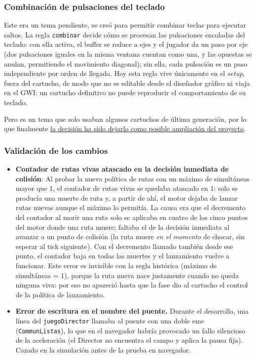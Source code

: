 \subsubsection{Combinación de pulsaciones del teclado}
Este era un tema pendiente, se creó para permitir combinar teclas para ejecutar saltos. La regla \texttt{combinar} decide cómo se procesan las pulsaciones encoladas del teclado: con ella activa, el buffer se reduce a ejes y el jugador da un paso por eje (dos pulsaciones iguales en la misma ventana cuentan como una, y las opuestas se anulan, permitiendo el movimiento diagonal); sin ella, cada pulsación es un paso independiente por orden de llegada. Hoy esta regla vive únicamente en el \emph{setup}, fuera del cartucho, de modo que no es editable desde el diseñador gráfico ni viaja en el GWI: un cartucho definitivo no puede reproducir el comportamiento de su teclado.

Pero es un tema que solo usaban algunos cartuchos de última generación, por lo que finalmente \underline{la decisión ha sido dejarlo como posible ampliación del proyecto}.

\subsubsection{Validación de los cambios}

\begin{itemize}
	\item \textbf{Contador de rutas vivas atascado en la decisión inmediata
		de colisión}: Al probar la nueva política de rutas con un máximo de
	simultáneas mayor que 1, el contador de rutas vivas se quedaba
	atascado en 1: solo se producía una muerte de ruta y, a partir de ahí,
	el motor dejaba de lanzar rutas nuevas aunque el máximo lo permitía.
	La causa era que el decremento del contador al morir una ruta solo
	se aplicaba en cuatro de los cinco puntos del motor donde una ruta
	muere; faltaba el de la decisión inmediata al avanzar a un punto de
	colisión (la ruta muere \emph{en el momento} de chocar, sin esperar al
	tick siguiente). Con el decremento llamado también desde ese punto, el
	contador baja en todas las muertes y el lanzamiento vuelve a
	funcionar. Este error es invisible con la regla histórica (máximo de
	simultáneas = 1), porque la ruta nueva nace justamente cuando no queda
	ninguna viva: por eso no apareció hasta que la fase dio al cartucho el
	control de la política de lanzamiento.
	
	\item \textbf{Error de escritura en el nombre del puente.} Durante el
	desarrollo, una línea del \texttt{juegoDirector} llamaba al puente con
	una doble eme (\texttt{CommunListas}), lo que en el navegador habría
	provocado un fallo silencioso de la aceleración (el Director no
	encuentra el campo y aplica la pausa fija). Cazado en la simulación
	antes de la prueba en navegador.
\end{itemize}